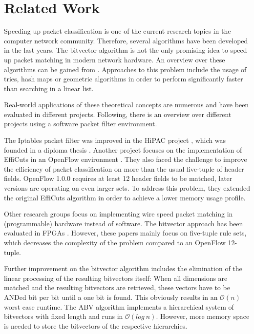 \documentclass[a4paper,
		12pt,
		parskip=full,
		titlepage
		]{scrartcl}
\begin{document}
\section{Related Work}
Speeding up packet classification is one of the current research topics in the computer network community.
Therefore, several algorithms have been developed in the last years.
The bitvector algorithm is not the only promising idea to speed up packet matching in modern network hardware.
An overview over these algorithms can be gained from \cite{algorithms_survey}.%
Approaches to this problem include the usage of tries, hash maps or geometric algorithms\cite{hicuts}
in order to perform significantly faster than searching in a linear list.

Real-world applications of these theoretical concepts are numerous and have been evaluated in different projects.
Following, there is an overview over different projects using a software packet filter environment.

The Iptables\cite{iptables} packet filter was improved in the HiPAC project \cite{hipac}, which was founded in a diploma thesis \cite{heinzhigh}.
Another project focuses on the implementation of EffiCuts in an OpenFlow environment \cite{stimpfling2013optimal}.
They also faced the challenge to improve the efficiency of packet classification on more than the usual five-tuple of header fields.
OpenFlow 1.0.0 \cite{openflow_spec10} requires at least 12 header fields to be matched, later versions are operating on even larger sets.
To address this problem, they extended the original EffiCuts algorithm in order to achieve a lower memory usage profile.

Other research groups focus on implementing wire speed packet matching in (programmable) hardware instead of software.
The bitvector approach \cite{bv} has been evaluated in FPGAs \cite{bitvector_fpga} \cite{qu2013fast}.
However, these papers mainly focus on five-tuple rule sets, which decreases the complexity of the problem compared to an OpenFlow 12-tuple.

Further improvement on the bitvector algorithm includes the elimination of the linear processing of the resulting bitvectors itself:
When all dimensions are matched and the resulting bitvectors are retrieved, these vectors have to be ANDed bit per bit until a one bit is found.
This obviously results in an $\mathcal O(n)$ worst case runtime.
The ABV algorithm \cite{abv} implements a hierarchical system of bitvectors with fixed length and runs in $\mathcal O(log\ n)$.
However, more memory space is needed to store the bitvectors of the respective hierarchies.
\end{document}

